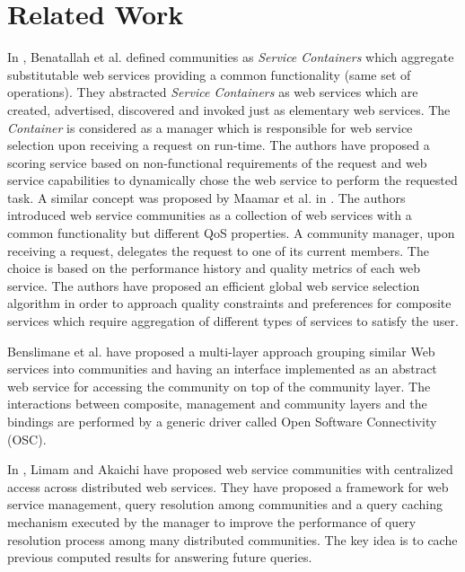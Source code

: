 \documentclass[10pt,journal,cspaper,compsoc]{IEEEtran}
\begin{document}
\section{Related Work}\label{s:related-work}

In \cite{DBLP:journals/internet/BenatallahSD03}, Benatallah et al.
defined communities as \emph{Service Containers} which aggregate
substitutable web services providing a common functionality (same
set of operations). They abstracted \emph{Service Containers} as
web services which are created, advertised, discovered and invoked
just as elementary web services. The \emph{Container} is
considered as a manager which is responsible for web service
selection upon receiving a request on run-time. The authors have
proposed a scoring service based on non-functional requirements of
the request and web service capabilities to dynamically chose the
web service to perform the requested task. A similar concept was
proposed by Maamar et al. in
\cite{DBLP:journals/ijebr/MaamarSTBB09}. The authors introduced
web service communities as a collection of web services with a
common functionality but different QoS properties. A community
manager, upon receiving a request, delegates the request to one of
its current members. The choice is based on the performance
history and quality metrics of each web service. The authors have
proposed an efficient global web service selection algorithm in
order to approach quality constraints and preferences for
composite services which require aggregation of different types of
services to satisfy the user.

Benslimane et al. \cite{Liris-2770} have proposed a multi-layer
approach grouping similar Web services into communities and having
an interface implemented as an abstract web service for accessing
the community on top of the community layer. The interactions
between composite, management and community layers and the
bindings are performed by a generic driver called Open Software
Connectivity (OSC).

In \cite{managing-hela-jalel}, Limam and Akaichi have proposed web
service communities with centralized access across distributed web
services. They have proposed a framework for web service
management, query resolution among communities and a query caching
mechanism executed by the manager to improve the performance of
query resolution process among many distributed communities. The
key idea is to cache previous computed results for answering
future queries.
\end{document}
